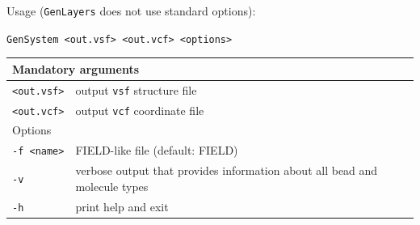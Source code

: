 Usage (\texttt{GenLayers} does not use standard options):

\vspace{1em}
\noindent
\texttt{GenSystem <out.vsf> <out.vcf> <options>}

\noindent
\begin{longtable}{p{}p{}}
  \toprule
  \multicolumn{2}{l}{Mandatory arguments} \\
  \midrule
  \texttt{<out.vsf>} & output \texttt{vsf} structure file \\
  \texttt{<out.vcf>} & output \texttt{vcf} coordinate file \\
  \toprule
  \multicolumn{2}{l}{Options} \\
  \midrule
  \texttt{-f <name>} & FIELD-like file (default: FIELD)\\
  \texttt{-v}        & verbose output that provides information about all
    bead and molecule types \\
  \texttt{-h}        & print help and exit \\
  \bottomrule
\end{longtable}
